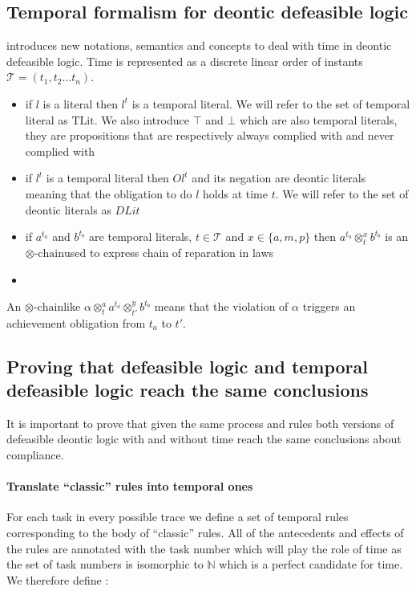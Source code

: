 \documentclass[10pt]{report}
\newcommand{\ochain}{$\otimes \text{-chain}$}
\begin{document}
\subsection{Temporal formalism for deontic defeasible logic}

\autocite{JusticeDelayed2011} introduces new notations, semantics and concepts to deal with time in deontic defeasible logic. Time is represented as a discrete linear order of instants $ \mathscr{T} = (t_{1}, t_{2} ... t_{n})$.
\begin{itemize}
\item if $l$ is a literal then $l^{t}$ is a temporal literal. We will refer to the set of temporal literal as $\text{TLit}$. We also introduce $\top$ and $\bot$ which are also temporal literals, they are propositions that are respectively always complied with and never complied with
\item if $l^{t}$ is a temporal literal then $Ol^{t}$ and its negation are deontic literals meaning that the obligation to do $l$ holds at time $t$. We will refer to the set of deontic literals as $DLit$
\item if $a^{t_{a}}$ and $b^{t_{b}}$ are temporal literals, $t \in \mathscr{T}$ and $x \in \{a,m,p\}$ then $a^{t_{a}} \otimes^{x}_{t} b^{t_{b}}$ is an \ochain used to express chain of reparation in laws
\item 
\end{itemize} 


An \ochain like $\alpha \otimes^{a}_{t} a^{t_{a}} \otimes^{y}_{t'} b^{t_{b}}$ means that the violation of $\alpha$ triggers an achievement obligation from $t_{a}$ to $t'$.

\subsection{Proving that defeasible logic and temporal defeasible logic reach the same conclusions}

It is important to prove that given the same process and rules both versions of defeasible deontic logic with and without time reach the same conclusions about compliance.

\paragraph{Translate \enquote{classic} rules into temporal ones}

For each task in every possible trace we define a set of temporal rules corresponding to the body of \enquote{classic} rules. All of the antecedents and effects of the rules are annotated with the task number which will play the role of time as the set of task numbers is isomorphic to $\mathbb{N}$ which is a perfect candidate for time. We therefore define :
\end{document}
